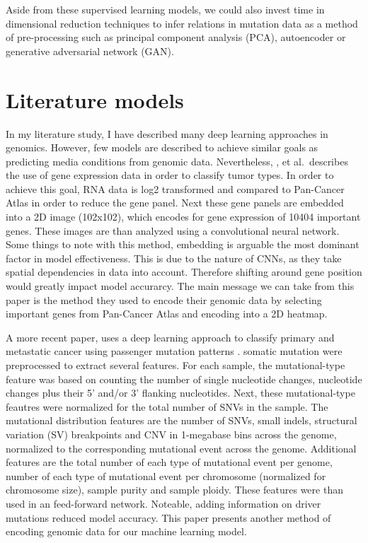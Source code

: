 \documentclass[11pt,]{article}
\begin{document}
Aside from these supervised learning models, we could also invest time
in dimensional reduction techniques to infer relations in mutation data
as a method of pre-processing such as principal component analysis
(PCA), autoencoder or generative adversarial network (GAN).

\hypertarget{literature-models}{%
\section{Literature models}\label{literature-models}}

In my literature study, I have described many deep learning approaches
in genomics. However, few models are described to achieve similar goals
as predicting media conditions from genomic data. Nevertheless,
\citet{Lyu2018}, et al.~describes the use of gene expression data in
order to classify tumor types. In order to achieve this goal, RNA data
is log2 transformed and compared to Pan-Cancer Atlas in order to reduce
the gene panel. Next these gene panels are embedded into a 2D image
(102x102), which encodes for gene expression of 10404 important genes.
These images are than analyzed using a convolutional neural network.
Some things to note with this method, embedding is arguable the most
dominant factor in model effectiveness. This is due to the nature of
CNNs, as they take spatial dependencies in data into account. Therefore
shifting around gene position would greatly impact model accurarcy. The
main message we can take from this paper is the method they used to
encode their genomic data by selecting important genes from Pan-Cancer
Atlas and encoding into a 2D heatmap.

A more recent paper, uses a deep learning approach to classify primary
and metastatic cancer using passenger mutation patterns
\citep{Jiao2020}. somatic mutation were preprocessed to extract several
features. For each sample, the mutational-type feature was based on
counting the number of single nucleotide changes, nucleotide changes
plus their 5' and/or 3' flanking nucleotides. Next, these
mutational-type feautres were normalized for the total number of SNVs in
the sample. The mutational distribution features are the number of SNVs,
small indels, structural variation (SV) breakpoints and CNV in
1-megabase bins across the genome, normalized to the corresponding
mutational event across the genome. Additional features are the total
number of each type of mutational event per genome, number of each type
of mutational event per chromosome (normalized for chromosome size),
sample purity and sample ploidy. These features were than used in an
feed-forward network. Noteable, adding information on driver mutations
reduced model accuracy. This paper presents another method of encoding
genomic data for our machine learning model.
\end{document}
